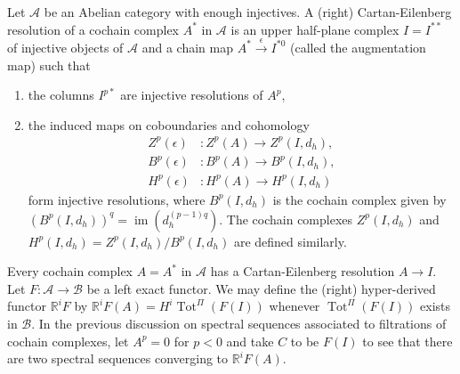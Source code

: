 \documentclass[11pt,leqno]{article}
\theoremstyle{plain}
\theoremstyle{definition}
\numberwithin{equation}{section}
\numberwithin{lem}{section}
\DeclareMathOperator{\im}{im}
\DeclareMathOperator{\Tot}{Tot}
\begin{document}
Let $\mathcal A$ be an Abelian category with enough injectives. A (right) Cartan-Eilenberg resolution of a cochain complex $A^\ast$ in $\mathcal A$ is an upper half-plane complex $I = I^{\ast\ast}$ of injective objects of $\mathcal A$ and a chain map $A^\ast\xrightarrow{\epsilon} I^{\ast 0}$ (called the augmentation map) such that \begin{enumerate}
  \item the columns $I^{p\ast}$ are injective resolutions of $A^p$,
  \item the induced maps on coboundaries and cohomology 
  \begin{align*}
    Z^p(\epsilon)&\colon Z^p(A)\to Z^p(I,d_h),\\
    B^p(\epsilon)&\colon B^p(A)\to B^p(I,d_h),\\
    H^p(\epsilon)&\colon H^p(A)\to H^p(I,d_h)
  \end{align*}
  form injective resolutions, where $B^p(I,d_h)$ is the cochain complex given by $(B^p(I,d_h))^q = \im(d_h^{(p-1)q})$. The cochain complexes $Z^p(I,d_h)$ and $H^p(I,d_h) = Z^p(I,d_h)/B^p(I,d_h)$ are defined similarly.
\end{enumerate}
Every cochain complex $A = A^\ast$ in $\mathcal A$ has a Cartan-Eilenberg resolution $A\to I$. Let $F\colon\mathcal A\to\mathcal B$ be a left exact functor. We may define the (right) hyper-derived functor $\mathbb R^iF$ by $\mathbb R^iF(A) = H^i\Tot^{\Pi}(F(I))$ whenever $\Tot^{\Pi}(F(I))$ exists in $\mathcal B$. In the previous discussion on spectral sequences associated to filtrations of cochain complexes, let $A^p = 0$ for $p<0$ and take $C$ to be $F(I)$ to see that there are two spectral sequences converging to $\mathbb R^iF(A)$.
\end{document}
